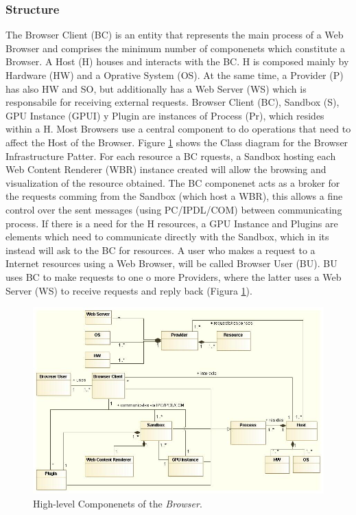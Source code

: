 \documentclass{sig-alternate-05-2015}
\begin{document}
    \subsubsection*{Structure}
    The Browser Client (BC) is an entity that represents the main process of a Web Browser and comprises the minimum number of componenets which constitute a Browser. A Host (H) houses and interacts with the BC. H is composed mainly by Hardware (HW) and a Oprative System (OS). At the same time, a Provider (P) has also HW and SO, but additionally has a Web Server (WS) which is responsabile for receiving external requests. Browser Client (BC), Sandbox (S), GPU Instance (GPUI) y Plugin are instances of Process (Pr), which resides within a H. Most Browsers use a central component to do operations that need to affect the Host of the Browser. Figure \ref{fig:BIPatt} shows the Class diagram for the Browser Infrastructure Patter. For each resource a BC rquests, a Sandbox hosting each Web Content Renderer (WBR) instance created will allow the browsing and visualization of the resource obtained. The BC componenet acts as a broker for the requests comming from the Sandbox (which host a WBR), this allows a fine control over the sent messages (using PC/IPDL/COM) between communicating process. If there is a need for the H resources, a GPU Instance and Plugins are elements which need to communicate directly with the Sandbox, which in its instead will ask to the BC for resources. A user who makes a request to a Internet resources using a Web Browser, will be called Browser User (BU). BU uses BC to make requests to one o more Providers, where the latter uses a Web Server (WS) to receive requests and reply back (Figura \ref{fig:BIPatt}).

    \begin{figure}[h!t]
      \centering
      \includegraphics[scale=0.55]{figures/browserInfraPattern_v3.jpg}
      \caption{High-level Componenets of the \textit{Browser}.}
      \label{fig:BIPatt}
    \end{figure}
\end{document}
